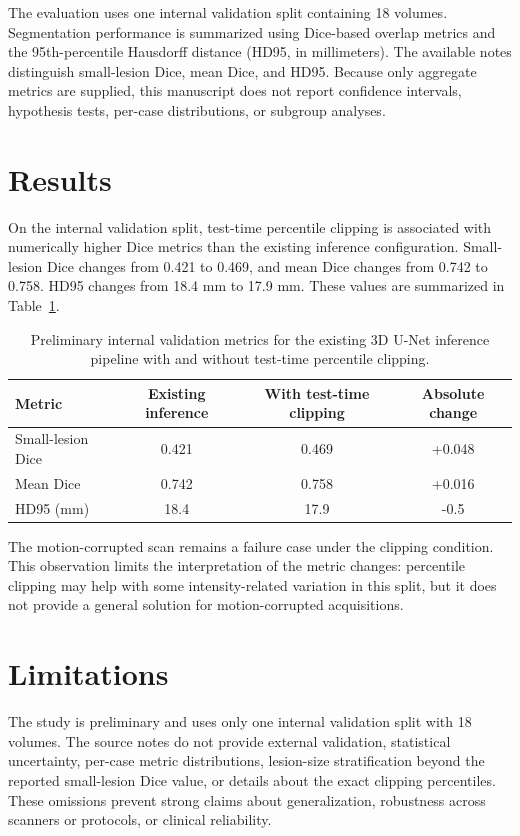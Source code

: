 \documentclass[11pt]{article}
\begin{document}
The evaluation uses one internal validation split containing 18 volumes. Segmentation performance is summarized using Dice-based overlap metrics and the 95th-percentile Hausdorff distance (HD95, in millimeters). The available notes distinguish small-lesion Dice, mean Dice, and HD95. Because only aggregate metrics are supplied, this manuscript does not report confidence intervals, hypothesis tests, per-case distributions, or subgroup analyses.

\section{Results}

On the internal validation split, test-time percentile clipping is associated with numerically higher Dice metrics than the existing inference configuration. Small-lesion Dice changes from 0.421 to 0.469, and mean Dice changes from 0.742 to 0.758. HD95 changes from 18.4 mm to 17.9 mm. These values are summarized in Table~\ref{tab:metrics}.

\begin{table}[htbp]
\centering
\caption{Preliminary internal validation metrics for the existing 3D U-Net inference pipeline with and without test-time percentile clipping.}
\label{tab:metrics}
\begin{tabular}{@{}lccc@{}}
\toprule
Metric & Existing inference & With test-time clipping & Absolute change \\
\midrule
Small-lesion Dice & 0.421 & 0.469 & +0.048 \\
Mean Dice & 0.742 & 0.758 & +0.016 \\
HD95 (mm) & 18.4 & 17.9 & -0.5 \\
\bottomrule
\end{tabular}
\end{table}

The motion-corrupted scan remains a failure case under the clipping condition. This observation limits the interpretation of the metric changes: percentile clipping may help with some intensity-related variation in this split, but it does not provide a general solution for motion-corrupted acquisitions.

\section{Limitations}

The study is preliminary and uses only one internal validation split with 18 volumes. The source notes do not provide external validation, statistical uncertainty, per-case metric distributions, lesion-size stratification beyond the reported small-lesion Dice value, or details about the exact clipping percentiles. These omissions prevent strong claims about generalization, robustness across scanners or protocols, or clinical reliability.
\end{document}

